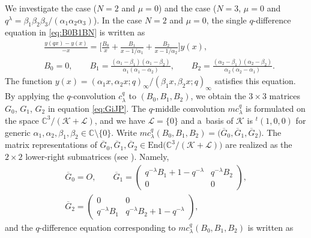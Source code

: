 \documentclass[pdftex]{sigma}
\numberwithin{equation}{section}
\theoremstyle{definition}
\begin{document}
We investigate the case ($N=2 $ and $\mu =0 $) and the case ($N=3 $, $\mu =0 $ and $q^{\lambda}=\beta_1\beta_2\beta_3/\allowbreak(\alpha_1\alpha_2\alpha_3) $).
In the case $N=2 $ and $\mu =0 $, the single $q$-difference equation in \eqref{eq:B0B1BN} is written as
\begin{align}
&\frac{y(qx) - y(x)}{-x} = \bigg[ \frac{B_0}{x} + \frac{B_1}{x-1/\alpha_1} + \frac{B_2}{x-1/\alpha_2} \bigg] y(x), \nonumber\\
& B_0= 0, \qquad
B_1= \frac{(\alpha_1-\beta_1)(\alpha_1-\beta_2)}{\alpha_1(\alpha_1-\alpha_2)},\qquad
B_2= \frac{(\alpha_2-\beta_1)(\alpha_2-\beta_2)}{\alpha_2(\alpha_2-\alpha_1)}. \label{eq:qeqvar2}
\end{align}
The function $y(x)=(\alpha_1 x, \alpha_2 x;q)_{\infty}/(\beta_1 x, \beta_2 x;q)_{\infty}$ satisfies this equation.
By applying the $q$-convolution $c^q_{\lambda}$ to $(B_0, B_1, B_2)$, we obtain the $3\times 3$ matrices $G_0$, $G_1$, $G_2$ in equation \eqref{eq:GiJP}.
The $q$-middle convolution $mc^q_{\lambda}$ is formulated on the space $\mathbb{C} ^3/ ( \mathcal{K} + \mathcal{L} )$, and we have $\mathcal{L} =\{ 0\} $ and a~basis of $\mathcal{K} $ is ${}^t (1,0,0) $ for generic $\alpha_1, \alpha_2, \beta_1, \beta_2 \in \mathbb{C} \setminus \{0\}$.
Write $mc^q_{\lambda} (B_0, B_1, B_2) = \bigl( \overline{G}_0, \overline{G}_1, \overline{G}_2\bigr)$.
The matrix representations of $\overline{G}_0, \overline{G}_1, \overline{G}_2 \in \mbox{End} \bigl(\mathbb{C} ^3/ ( \mathcal{K} + \mathcal{L} )\bigr) $ are realized as the $2\times 2$ lower-right submatrices (see \cite{AT}).
Namely,
\begin{gather}
\overline{G}_0=O, \qquad
 \overline{G}_1= \begin{pmatrix}
 q^{-\lambda}B_1 + 1 -q^{-\lambda} & q^{-\lambda}B_2 \\
 0 & 0
 \end{pmatrix},\nonumber \\
 \overline{G}_2= \begin{pmatrix}
 0 & 0 \\
 q^{-\lambda}B_1 & q^{-\lambda}B_2 + 1 -q^{-\lambda}
 \end{pmatrix}, \label{eq:oG1oG2}
\end{gather}
and the $q$-difference equation corresponding to $mc^q_{\lambda} (B_0, B_1, B_2)$ is written as
\end{document}
